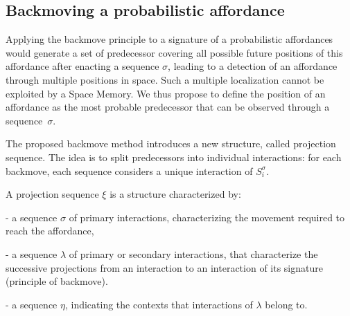 \documentclass[conference]{IEEEtran}
\begin{document}
\subsection{Backmoving a probabilistic affordance}

Applying the backmove principle to a signature of a probabilistic affordances would generate a set of predecessor covering all possible future positions of this affordance after enacting a sequence $\sigma$, leading to a detection of an affordance through multiple positions in space.
Such a multiple localization cannot be exploited by a Space Memory. We thus propose to define the position of an affordance as the most probable predecessor that can be observed through a sequence~$\sigma$.

The proposed backmove method introduces a new structure, called projection sequence. The idea is to split predecessors into individual interactions: for each backmove, each sequence considers a unique interaction of $S_i^{\sigma}$.

A projection sequence $\xi$ is a structure characterized by:

- a sequence $\sigma$ of primary interactions, characterizing the movement required to reach the affordance,

- a sequence $\lambda$ of primary or secondary interactions, that characterize the successive projections from an interaction to an interaction of its signature (principle of backmove).

- a sequence $\eta$, indicating the contexts that interactions of $\lambda$ belong to.
\end{document}
